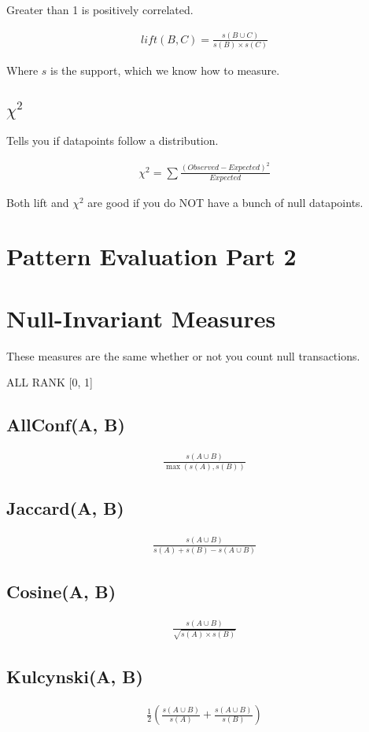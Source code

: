 \documentclass[fleqn]{report}
\newcommand{\equations} [1] {
\begin{gather*}
#1
\end{gather*}
}
\begin{document}
Greater than 1 is positively correlated.

\equations{
    lift(B, C)
    =
    \frac{s(B \cup C)}{s(B) \times s(C)}
}
Where $s$ is the support, which we know how to measure.



\subsection{$\chi^2$}
Tells you if datapoints follow a distribution.

\equations{
    \chi^2 
    =
    \sum
    \frac{(Observed - Expected)^2}{Expected}
}


Both lift and $\chi^2$ are good if you do NOT have a bunch of null datapoints.

\section{Pattern Evaluation Part 2}


\section{Null-Invariant Measures}
These measures are the same whether or not you count 
null transactions.

ALL RANK [0, 1]

\subsection{AllConf(A, B)}
\equations{
    \frac{s(A \cup B)}{\max(s(A), s(B))}
}

\subsection{Jaccard(A, B)}
\equations{
    \frac{s(A \cup B)}{s(A) + s(B) - s(A \cup B)}
}

\subsection{Cosine(A, B)}
\equations{
    \frac{s(A \cup B)}{\sqrt{s(A) \times s(B)}}
}

\subsection{Kulcynski(A, B)}
\equations{
    \frac{1}{2} \left( \frac{s(A \cup B)}{s(A)} + \frac{s(A \cup B)}{s(B)} \right)
}
\end{document}
